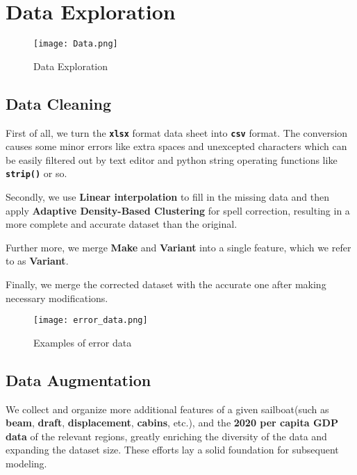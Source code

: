 \documentclass[12pt]{article}  %
\begin{document}
\section{Data Exploration}
\begin{figure}[htbp]
    \centering
    \texttt{[image: Data.png]}
    \caption{Data Exploration}\label{fig:Data}
\end{figure}

\subsection{Data Cleaning}
First of all, we turn the \textbf{\texttt{xlsx}} format data sheet into \textbf{\texttt{csv}} format. 
The conversion causes some minor errors like extra spaces and unexcepted characters which can be easily filtered out by text editor and python string operating functions like \textbf{\texttt{strip()}} or so.

Secondly, we use \textbf{Linear interpolation} to fill in the missing data and then apply \textbf{Adaptive Density-Based Clustering} for spell correction,
resulting in a more complete and accurate dataset than the original.

Further more, we merge \textbf{Make} and \textbf{Variant} into a single feature, which we refer to as \textbf{Variant}.

Finally, we merge the corrected dataset with the accurate one after making necessary modifications.
\begin{figure}[htbp]
    \centering
    \texttt{[image: error\_data.png]}
    \caption{Examples of error data}\label{fig:error_data}
\end{figure}

\subsection{Data Augmentation}
We collect and organize more additional features of a given sailboat(such as \textbf{beam}, \textbf{draft}, \textbf{displacement}, \textbf{cabins}, etc.),
and the \textbf{2020 per capita GDP data} of the relevant regions, 
greatly enriching the diversity of the data and expanding the dataset size. 
These efforts lay a solid foundation for subsequent modeling.
\end{document}
